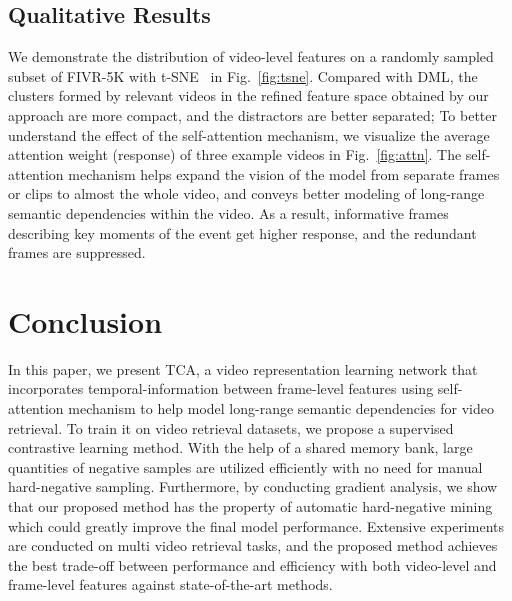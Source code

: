 \documentclass[10pt,twocolumn,letterpaper]{article}
\begin{document}
\subsection{Qualitative Results}
We demonstrate the distribution of video-level features on a randomly sampled subset of FIVR-5K with t-SNE~\cite{maaten2008visualizing} in Fig.~\ref{fig:tsne}. Compared with DML, the clusters formed by relevant videos in the refined feature space obtained by our approach are more compact, and the distractors are better separated;
To better understand the effect of the self-attention mechanism, we visualize the average attention weight (response) of three example videos in Fig.~\ref{fig:attn}. The self-attention mechanism helps expand the vision of the model from separate frames or clips to almost the whole video, and conveys better modeling of long-range semantic dependencies within the video. As a result, informative frames describing key moments of the event get higher response, and the redundant frames are suppressed.


\section{Conclusion}
In this paper, we present TCA, a video representation learning network that incorporates temporal-information between frame-level features using self-attention mechanism to help model long-range semantic dependencies for video retrieval. To train it on video retrieval datasets, we propose a supervised contrastive learning method. With the help of a shared memory bank, large quantities of negative samples  are utilized efficiently with no need for manual hard-negative sampling. Furthermore, by conducting gradient analysis, we show that our proposed method has the property of automatic hard-negative mining which could greatly improve the final model performance. Extensive experiments are conducted on multi video retrieval tasks, and the proposed method achieves the best trade-off between performance and efficiency with both video-level and frame-level features against state-of-the-art methods.


{\small


}
\end{document}

